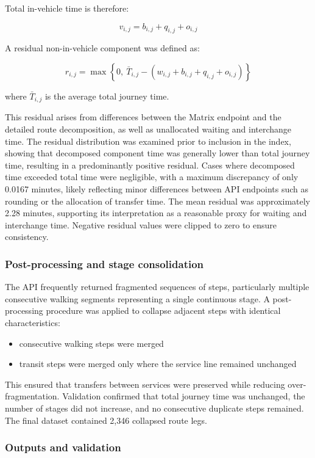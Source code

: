 \documentclass[11pt,a4paper]{article}
\begin{document}
Total in-vehicle time is therefore:

\[
v_{i,j} = b_{i,j} + q_{i,j} + o_{i,j}
\]

A residual non-in-vehicle component was defined as:

\[
r_{i,j} = \max \left\{0,\ \bar{T}_{i,j} - (w_{i,j} + b_{i,j} + q_{i,j} + o_{i,j}) \right\}
\]

where \(\bar{T}_{i,j}\) is the average total journey time.

This residual arises from differences between the Matrix endpoint and the detailed route decomposition, as well as unallocated waiting and interchange time. The residual distribution was examined prior to inclusion in the index, showing that decomposed component time was generally lower than total journey time, resulting in a predominantly positive residual. Cases where decomposed time exceeded total time were negligible, with a maximum discrepancy of only 0.0167 minutes, likely reflecting minor differences between API endpoints such as rounding or the allocation of transfer time. The mean residual was approximately 2.28 minutes, supporting its interpretation as a reasonable proxy for waiting and interchange time. Negative residual values were clipped to zero to ensure consistency.

\subsubsection{Post-processing and stage consolidation}

The API frequently returned fragmented sequences of steps, particularly multiple consecutive walking segments representing a single continuous stage. A post-processing procedure was applied to collapse adjacent steps with identical characteristics:

\begin{itemize}
    \item consecutive walking steps were merged
    \item transit steps were merged only where the service line remained unchanged
\end{itemize}

This ensured that transfers between services were preserved while reducing over-fragmentation. Validation confirmed that total journey time was unchanged, the number of stages did not increase, and no consecutive duplicate steps remained. The final dataset contained 2,346 collapsed route legs.

\subsubsection{Outputs and validation}
\end{document}
